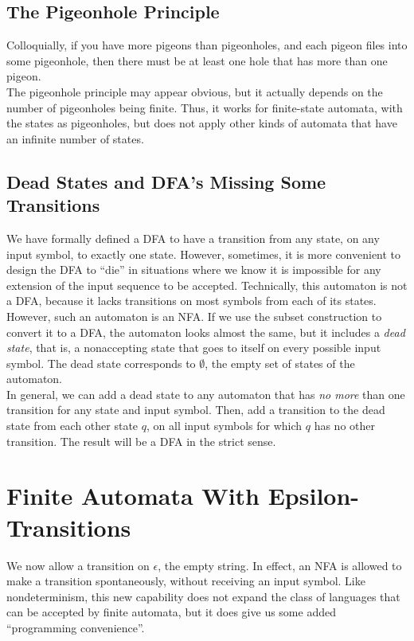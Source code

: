 \documentclass[]{article}
\begin{document}
  \subsection*{The Pigeonhole Principle}
    Colloquially, if you have more pigeons than pigeonholes, and each pigeon 
    files into some pigeonhole, then there must be at least one hole that has 
    more than one pigeon. \\
    \indent The pigeonhole principle may appear obvious, but it actually 
    depends on the number of pigeonholes being finite. Thus, it works for 
    finite-state automata, with the states as pigeonholes, but does not apply 
    other kinds of automata that have an infinite number of states.
    
  \subsection*{Dead States and DFA's Missing Some Transitions}
    We have formally defined a DFA to have a transition from any state, on any 
    input symbol, to exactly one state. However, sometimes, it is more 
    convenient to design the DFA to ``die'' in situations where we know it is 
    impossible for any extension of the input sequence to be accepted. 
    Technically, this automaton is not a DFA, because it lacks transitions on 
    most symbols from each of its states. \\
    \indent However, such an automaton is an NFA. If we use the subset 
    construction to convert it to a DFA, the automaton looks almost the same, 
    but it includes a \emph{dead state}, that is, a nonaccepting state that 
    goes to itself on every possible input symbol. The dead state corresponds 
    to $\emptyset$, the empty set of states of the automaton. \\
    \indent In general, we can add a dead state to any automaton that has 
    \emph{no more} than one transition for any state and input symbol. Then, 
    add a transition to the dead state from each other state $q$, on all input 
    symbols for which $q$ has no other transition. The result will be a DFA in 
    the strict sense.
    
\section*{Finite Automata With Epsilon-Transitions}
  We now allow a transition on $\epsilon$, the empty string. In effect, an NFA 
  is allowed to make a transition spontaneously, without receiving an input 
  symbol. Like nondeterminism, this new capability does not expand the class 
  of languages that can be accepted by finite automata, but it does give us 
  some added ``programming convenience''.
  
\end{document}
